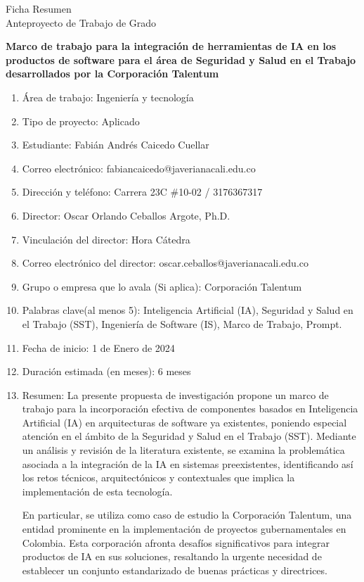 \thispagestyle{empty}
\begin{center}
    \Large{Ficha Resumen \\ Anteproyecto de Trabajo de Grado}
\end{center}

\textbf{Marco de trabajo para la integración de herramientas de IA en los productos de software para el área de Seguridad y Salud en el Trabajo desarrollados por la Corporación Talentum}
\begin{enumerate}
    \item Área de trabajo: Ingeniería y tecnología
    \item Tipo de proyecto: Aplicado
    \item Estudiante: Fabián Andrés Caicedo Cuellar
    \item Correo electrónico: fabiancaicedo@javerianacali.edu.co
    \item Dirección y teléfono: Carrera 23C \#10-02 / 3176367317
    \item Director: Oscar Orlando Ceballos Argote, Ph.D.
    \item Vinculación del director: Hora C\'atedra
    \item Correo electrónico del director: oscar.ceballos@javerianacali.edu.co
    \item Grupo o empresa que lo avala (Si aplica): Corporación Talentum
    \item Palabras clave(al menos 5): Inteligencia Artificial (IA), Seguridad y Salud en el Trabajo
(SST), Ingeniería de Software (IS), Marco de Trabajo, Prompt.
    \item Fecha de inicio: 1 de Enero de 2024
    \item Duración estimada (en meses): 6 meses
    \item Resumen:  La presente propuesta de investigación propone un marco de trabajo para la incorporación efectiva de componentes basados en Inteligencia Artificial (IA) en arquitecturas de software ya existentes, poniendo especial atención en el ámbito de la Seguridad y Salud en el Trabajo (SST). Mediante un análisis y revisión de la literatura existente, se examina la problemática asociada a la integración de la IA en sistemas preexistentes, identificando así los retos técnicos, arquitectónicos y contextuales que implica la implementación de esta tecnología.

En particular, se utiliza como caso de estudio la Corporación Talentum, una entidad prominente en la implementación de proyectos gubernamentales en Colombia. Esta corporación afronta desafíos significativos para integrar productos de IA en sus soluciones, resaltando la urgente necesidad de establecer un conjunto estandarizado de buenas prácticas y directrices.


\end{enumerate}
